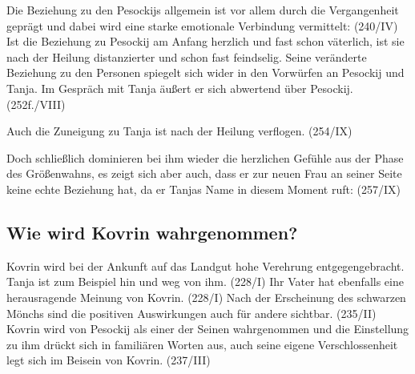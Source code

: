 \documentclass{../../sem_paper}
\begin{document}
Die Beziehung zu den Pesockijs allgemein ist vor allem durch die Vergangenheit geprägt und dabei
wird eine starke emotionale Verbindung vermittelt: (240/IV)
Ist die Beziehung zu Pesockij am Anfang herzlich und fast schon väterlich, ist sie nach der Heilung
distanzierter und schon fast feindselig. Seine veränderte Beziehung zu den Personen spiegelt sich
wider in den Vorwürfen an Pesockij und Tanja. Im Gespräch mit Tanja äußert er sich abwertend
über Pesockij. (252f./VIII)

Auch die Zuneigung zu Tanja ist nach der Heilung verflogen. (254/IX)

Doch schließlich dominieren bei ihm wieder die herzlichen Gefühle aus der Phase des
Größenwahns, es zeigt sich aber auch, dass er zur neuen Frau an seiner Seite keine echte Beziehung
hat, da er Tanjas Name in diesem Moment ruft: (257/IX)

\subsection{Wie wird Kovrin wahrgenommen?}
Kovrin wird bei der Ankunft auf das Landgut hohe Verehrung entgegengebracht. Tanja ist zum
Beispiel hin und weg von ihm. (228/I) Ihr Vater hat ebenfalls eine herausragende Meinung von Kovrin. 
(228/I) Nach der Erscheinung des schwarzen Mönchs sind die positiven
Auswirkungen auch für andere sichtbar. (235/II)
Kovrin wird von Pesockij als einer der Seinen wahrgenommen und die Einstellung zu ihm drückt
sich in familiären Worten aus, auch seine eigene Verschlossenheit legt sich im Beisein von Kovrin.
(237/III)
\end{document}
